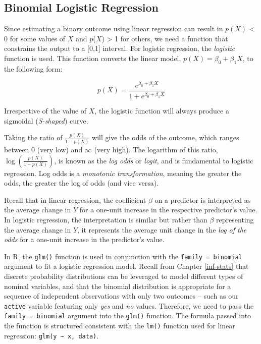 \documentclass[
]{book}
\begin{document}
\hypertarget{binomial-logistic-regression}{%
\subsection{Binomial Logistic Regression}\label{binomial-logistic-regression}}

Since estimating a binary outcome using linear regression can result in \(p(X)\) \textless{} 0 for some values of \(X\) and \(p\)(\(X\)) \textgreater{} 1 for others, we need a function that constrains the output to a {[}0,1{]} interval. For logistic regression, the \emph{logistic} function is used. This function converts the linear model, \(p(X) = \beta_0 + \beta_1 X\), to the following form:

\[ p(X) = \frac{e^{\beta_0 + \beta_1 X}}{1+e^{\beta_0 + \beta_1 X}} \]

Irrespective of the value of \(X\), the logistic function will always produce a sigmoidal (\emph{S-shaped}) curve.

Taking the ratio of \(\frac {p(X)}{1 - p(X)}\) will give the odds of the outcome, which ranges between 0 (very low) and \(\infty\) (very high). The logarithm of this ratio, \(\log(\frac {p(X)}{1 - p(X)})\), is known as the \emph{log odds} or \emph{logit}, and is fundamental to logistic regression. Log odds is a \emph{monotonic transformation}, meaning the greater the odds, the greater the log of odds (and vice versa).

Recall that in linear regression, the coefficient \(\beta\) on a predictor is interpreted as the average change in \(Y\) for a one-unit increase in the respective predictor's value. In logistic regression, the interpretation is similar but rather than \(\beta\) representing the average change in \(Y\), it represents the average unit change in the \emph{log of the odds} for a one-unit increase in the predictor's value.

In R, the \texttt{glm()} function is used in conjunction with the \texttt{family\ =\ binomial} argument to fit a logistic regression model. Recall from Chapter \ref{inf-stats} that discrete probability distributions can be leveraged to model different types of nominal variables, and that the binomial distribution is appropriate for a sequence of independent observations with only two outcomes -- such as our \texttt{active} variable featuring only \emph{yes} and \emph{no} values. Therefore, we need to pass the \texttt{family\ =\ binomial} argument into the \texttt{glm()} function. The formula passed into the function is structured consistent with the \texttt{lm()} function used for linear regression: \texttt{glm(y\ \textasciitilde{}\ x,\ data)}.
\end{document}
